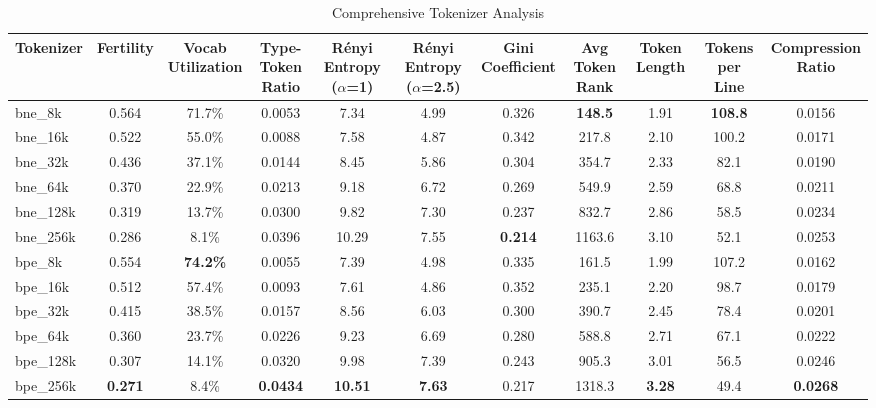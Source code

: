 \begin{table}[htbp]
\centering
\caption{Comprehensive Tokenizer Analysis}
\label{tab:comprehensive_metrics}
\begin{tabular}{lcccccccccc}
\toprule
Tokenizer & Fertility & \makecell{Vocab \\ Utilization} & \makecell{Type-Token \\ Ratio} & \makecell{Rényi Entropy \\ ($\alpha$=1)} & \makecell{Rényi Entropy \\ ($\alpha$=2.5)} & \makecell{Gini \\ Coefficient} & Avg Token Rank & Token Length & Tokens per Line & \makecell{Compression \\ Ratio} \\
\midrule
bne\_8k & 0.564 & 71.7\% & 0.0053 & 7.34 & 4.99 & 0.326 & \textbf{148.5} & 1.91 & \textbf{108.8} & 0.0156 \\
bne\_16k & 0.522 & 55.0\% & 0.0088 & 7.58 & 4.87 & 0.342 & 217.8 & 2.10 & 100.2 & 0.0171 \\
bne\_32k & 0.436 & 37.1\% & 0.0144 & 8.45 & 5.86 & 0.304 & 354.7 & 2.33 & 82.1 & 0.0190 \\
bne\_64k & 0.370 & 22.9\% & 0.0213 & 9.18 & 6.72 & 0.269 & 549.9 & 2.59 & 68.8 & 0.0211 \\
bne\_128k & 0.319 & 13.7\% & 0.0300 & 9.82 & 7.30 & 0.237 & 832.7 & 2.86 & 58.5 & 0.0234 \\
bne\_256k & 0.286 & 8.1\% & 0.0396 & 10.29 & 7.55 & \textbf{0.214} & 1163.6 & 3.10 & 52.1 & 0.0253 \\
bpe\_8k & 0.554 & \textbf{74.2\%} & 0.0055 & 7.39 & 4.98 & 0.335 & 161.5 & 1.99 & 107.2 & 0.0162 \\
bpe\_16k & 0.512 & 57.4\% & 0.0093 & 7.61 & 4.86 & 0.352 & 235.1 & 2.20 & 98.7 & 0.0179 \\
bpe\_32k & 0.415 & 38.5\% & 0.0157 & 8.56 & 6.03 & 0.300 & 390.7 & 2.45 & 78.4 & 0.0201 \\
bpe\_64k & 0.360 & 23.7\% & 0.0226 & 9.23 & 6.69 & 0.280 & 588.8 & 2.71 & 67.1 & 0.0222 \\
bpe\_128k & 0.307 & 14.1\% & 0.0320 & 9.98 & 7.39 & 0.243 & 905.3 & 3.01 & 56.5 & 0.0246 \\
bpe\_256k & \textbf{0.271} & 8.4\% & \textbf{0.0434} & \textbf{10.51} & \textbf{7.63} & 0.217 & 1318.3 & \textbf{3.28} & 49.4 & \textbf{0.0268} \\
\bottomrule
\end{tabular}
\end{table}